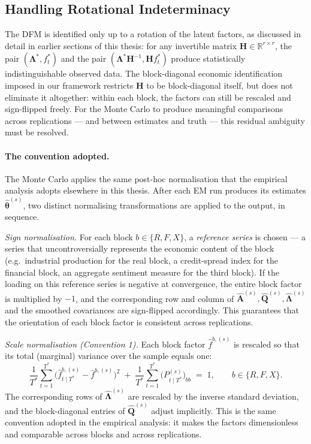 \documentclass[11pt, a4paper, oneside]{article}
\newcommand{\R}{\mathbb{R}}
\newcommand{\mL}{\boldsymbol{\Lambda}}
\newcommand{\mA}{\mathbf{A}}
\begin{document}
\newpage

\subsection{Handling Rotational Indeterminacy}
\label{subsec:mc-rotational}

The DFM is identified only up to a rotation of the latent factors,
as discussed in detail in earlier sections of this thesis: for any
invertible matrix $\mathbf{H} \in \R^{r \times r}$, the pair
$(\mL^*, f_t^*)$ and the pair
$(\mL^* \mathbf{H}^{-1}, \mathbf{H} f_t^*)$ produce statistically
indistinguishable observed data. The block-diagonal economic
identification imposed in our framework restricts $\mathbf{H}$ to
be block-diagonal itself, but does not eliminate it altogether:
within each block, the factors can still be rescaled and
sign-flipped freely. For the Monte Carlo to produce meaningful
comparisons across replications — and between estimates and truth
— this residual ambiguity must be resolved.

\paragraph{The convention adopted.}
The Monte Carlo applies the same post-hoc normalisation that the
empirical analysis adopts elsewhere in this thesis. After each EM
run produces its estimates $\hat{\boldsymbol{\theta}}^{(s)}$, two
distinct normalising transformations are applied to the output, in
sequence.

\emph{Sign normalisation.} For each block $b \in \{R, F, X\}$, a
\emph{reference series} is chosen — a series that uncontroversially
represents the economic content of the block (e.g.\ industrial
production for the real block, a credit-spread index for the
financial block, an aggregate sentiment measure for the third
block). If the loading on this reference series is negative at
convergence, the entire block factor is multiplied by $-1$, and
the corresponding row and column of $\hat{\mA}^{(s)},
\hat{\mathbf{Q}}^{(s)}, \hat{\boldsymbol{\Lambda}}^{(s)}$ and the
smoothed covariances are sign-flipped accordingly. This guarantees
that the orientation of each block factor is consistent across
replications.

\emph{Scale normalisation (Convention 1).} Each block factor
$\hat{f}^{b, (s)}$ is rescaled so that its total (marginal)
variance over the sample equals one:
\[
\frac{1}{T^*}\sum_{t=1}^{T^*}\big(\hat{f}^{b, (s)}_{t \mid T^*} - \bar{f}^{b, (s)}\big)^2
\;+\;
\frac{1}{T^*}\sum_{t=1}^{T^*}\big(P^{(s)}_{t \mid T^*}\big)_{bb}
\;=\; 1,
\qquad b \in \{R, F, X\}.
\]
The corresponding rows of $\hat{\boldsymbol{\Lambda}}^{(s)}$ are
rescaled by the inverse standard deviation, and the block-diagonal
entries of $\hat{\mathbf{Q}}^{(s)}$ adjust implicitly. This is the
same convention adopted in the empirical analysis: it makes the
factors dimensionless and comparable across blocks and across
replications.
\end{document}

